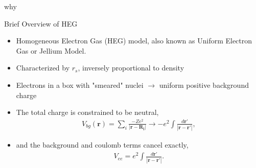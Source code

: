\documentclass[10pt]{beamer}
\begin{document}
{{{{{\begin{frame}
why

\end{frame}

{%

\begin{frame}{Brief Overview of HEG}
	\begin{itemize}[<+->]
		\item{Homogeneous Electron Gas (HEG) model, also known as Uniform Electron Gas or Jellium 
		Model.}
		\item{Characterized by \alert{$r_s$}, inversely proportional to density}
		\item{Electrons in a box with "smeared" nuclei $\rightarrow$ uniform positive background charge}

		\item{The total charge is constrained to be neutral,}
			\begin{eqnarray}
				V_{bg}(\mathbf{r}) = \sum\limits_{i} \frac{-Ze^2}{|\mathbf{r}-\mathbf{R_i}|} \rightarrow -e^2 \int \frac{d\mathbf{r'}}{|\mathbf{r}-\mathbf{r'}|},
			\end{eqnarray}
		\item{and the background and coulomb terms cancel exactly,
			\begin{eqnarray}
				V_{ee} = e^2 \int \frac{d\mathbf{r'}}{|\mathbf{r}-\mathbf{r'}|}.
			\end{eqnarray}
		}
	\end{itemize}
\end{frame}

{%

}}}}}}}
\end{document}
